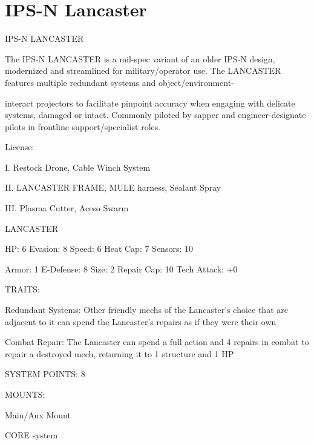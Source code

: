 \section{IPS-N Lancaster}

                                         IPS-N LANCASTER  

The IPS-N LANCASTER is a mil-spec variant of an older IPS-N design, modernized and streamlined for  
military/operator use. The LANCASTER features multiple redundant systems and object/environment- 

interact projectors to facilitate pinpoint accuracy when engaging with delicate systems, damaged or intact.  
Commonly piloted by sapper and engineer-designate pilots in frontline support/specialist roles. 
 

                                                   License:
 
I. Restock Drone, Cable Winch System
 
II. LANCASTER FRAME, MULE harness, Sealant Spray
 
III. Plasma Cutter, Aceso Swarm
 

                                                LANCASTER 

  HP: 6          Evasion: 8                            Speed: 6           Heat Cap: 7        Sensors: 10 

  Armor: 1       E-Defense: 8                          Size: 2            Repair Cap: 10     Tech Attack:  
                                                                                             +0 

                                                   TRAITS: 

  Redundant Systems: Other friendly mechs of the Lancaster’s choice that are adjacent to it can spend  
  the Lancaster’s repairs as if they were their own
 
  Combat Repair: The Lancaster can spend a full action and 4 repairs in combat to repair a destroyed  
  mech, returning it to 1 structure and 1 HP 

                                             SYSTEM POINTS: 8 

                                                   MOUNTS: 

  Main/Aux Mount 

                                                CORE system 

                                                                                                            



